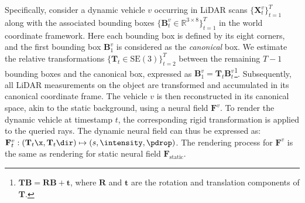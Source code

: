 Specifically, consider a dynamic vehicle $v$ 
occurring in LiDAR scans $\{\mathbf{X}^v_t\}_{t=1}^{T}$ along with the associated bounding boxes $\{\mathbf{B}^v_t \in \mathbb{R}^{3\times 8}\}_{t=1}^{T}$ in the world coordinate framework. Here each bounding box is defined by its eight corners, and the first bounding box $\mathbf{B}^v_1$ is considered as the \textit{canonical} box. We estimate the relative transformations $\{\mathbf{T}_t \in \text{SE}(3)\}_{t=2}^{T}$ between the remaining $T-1$ bounding boxes and the canonical box, expressed as $\mathbf{B}_1^v = \mathbf{T}_t \mathbf{B}_t^v$\footnote{$\mathbf{T}\mathbf{B} = \mathbf{R}\mathbf{B} + \mathbf{t}$, where $\mathbf{R}$ and $\mathbf{t}$ are the rotation and translation components of $\mathbf{T}$.}. 
Subsequently, all LiDAR measurements on the object are transformed and accumulated in its canonical coordinate frame. The vehicle $v$ is then reconstructed in its canonical space, akin to the static background, using a neural field $\mathbf{F}^v$. To render the dynamic vehicle at timestamp $t$, the corresponding rigid transformation is applied to the queried rays. The dynamic neural field can thus be expressed as: $\mathbf{F}^v_t: (\mathbf{T}_{t}\x, \mathbf{T}_{t}\dir) \mapsto (s, \intensity, \pdrop)$. The rendering process for $\mathbf{F}^v$ is the same as rendering for static neural field $\mathbf{F}_{\text{static}}$.


